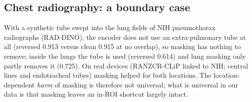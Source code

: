 \subsection{Chest radiography: a boundary case}
With a synthetic tube swept into the lung fields of NIH pneumothorax radiographs (RAD-DINO), the encoder does not
use an extra-pulmonary tube at all (reversed 0.913 versus clean 0.915 at no overlap), so masking has nothing to
remove; inside the lungs the tube is used (reversed 0.614) and lung masking only partly removes it (0.725). On real
devices (RANZCR-CLiP linked to NIH; central lines and endotracheal tubes) masking helped for both locations. The
location-dependent \emph{harm} of masking is therefore not universal; what is universal in our data is that
masking leaves an in-ROI shortcut largely intact.
